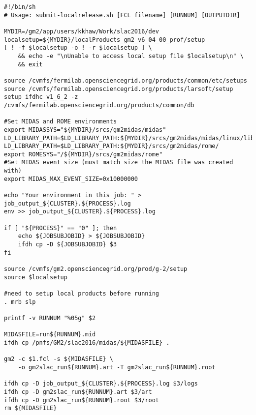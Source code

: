 \begin{Verbatim}
#!/bin/sh
# Usage: submit-localrelease.sh [FCL filename] [RUNNUM] [OUTPUTDIR]

MYDIR=/gm2/app/users/kkhaw/Work/slac2016/dev
localsetup=${MYDIR}/localProducts_gm2_v6_04_00_prof/setup
[ ! -f $localsetup -o ! -r $localsetup ] \
    && echo -e "\nUnable to access local setup file $localsetup\n" \
    && exit

source /cvmfs/fermilab.opensciencegrid.org/products/common/etc/setups
source /cvmfs/fermilab.opensciencegrid.org/products/larsoft/setup
setup ifdhc v1_6_2 -z /cvmfs/fermilab.opensciencegrid.org/products/common/db

#Set MIDAS and ROME environments
export MIDASSYS="${MYDIR}/srcs/gm2midas/midas"
LD_LIBRARY_PATH=$LD_LIBRARY_PATH:${MYDIR}/srcs/gm2midas/midas/linux/lib
LD_LIBRARY_PATH=$LD_LIBRARY_PATH:${MYDIR}/srcs/gm2midas/rome/
export ROMESYS="/${MYDIR}/srcs/gm2midas/rome"
#Set MIDAS event size (must match size the MIDAS file was created with)
export MIDAS_MAX_EVENT_SIZE=0x10000000

echo "Your environment in this job: " > job_output_${CLUSTER}.${PROCESS}.log
env >> job_output_${CLUSTER}.${PROCESS}.log

if [ "${PROCESS}" == "0" ]; then
    echo ${JOBSUBJOBID} > ${JOBSUBJOBID}
    ifdh cp -D ${JOBSUBJOBID} $3
fi

source /cvmfs/gm2.opensciencegrid.org/prod/g-2/setup
source $localsetup

#need to setup local products before running
. mrb slp

printf -v RUNNUM "%05g" $2

MIDASFILE=run${RUNNUM}.mid
ifdh cp /pnfs/GM2/slac2016/midas/${MIDASFILE} .

gm2 -c $1.fcl -s ${MIDASFILE} \
	-o gm2slac_run${RUNNUM}.art -T gm2slac_run${RUNNUM}.root

ifdh cp -D job_output_${CLUSTER}.${PROCESS}.log $3/logs
ifdh cp -D gm2slac_run${RUNNUM}.art $3/art
ifdh cp -D gm2slac_run${RUNNUM}.root $3/root
rm ${MIDASFILE}
\end{Verbatim}
